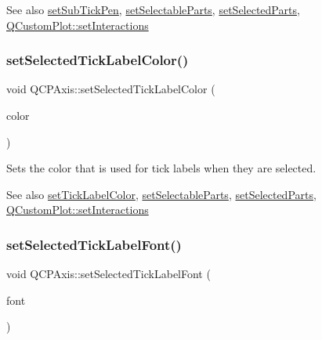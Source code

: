 \begin{DoxySeeAlso}{See also}
\mbox{\hyperlink{class_q_c_p_axis_aede4028ae7516bd51a60618a8233f9cf}{set\+Sub\+Tick\+Pen}}, \mbox{\hyperlink{class_q_c_p_axis_a513f9b9e326c505d9bec54880031b085}{set\+Selectable\+Parts}}, \mbox{\hyperlink{class_q_c_p_axis_ab9d7a69277dcbed9119b3c1f25ca19c3}{set\+Selected\+Parts}}, \mbox{\hyperlink{class_q_custom_plot_a5ee1e2f6ae27419deca53e75907c27e5}{Q\+Custom\+Plot\+::set\+Interactions}} 
\end{DoxySeeAlso}
\mbox{\label{class_q_c_p_axis_a9bdbf5e63ab15187f3a1de9440129227}} 
\subsubsection{\texorpdfstring{set\+Selected\+Tick\+Label\+Color()}{setSelectedTickLabelColor()}}
{\footnotesize\ttfamily void Q\+C\+P\+Axis\+::set\+Selected\+Tick\+Label\+Color (\begin{DoxyParamCaption}\item[{const Q\+Color \&}]{color }\end{DoxyParamCaption})}

Sets the color that is used for tick labels when they are selected.

\begin{DoxySeeAlso}{See also}
\mbox{\hyperlink{class_q_c_p_axis_a395e445c3fe496b935bee7b911ecfd1c}{set\+Tick\+Label\+Color}}, \mbox{\hyperlink{class_q_c_p_axis_a513f9b9e326c505d9bec54880031b085}{set\+Selectable\+Parts}}, \mbox{\hyperlink{class_q_c_p_axis_ab9d7a69277dcbed9119b3c1f25ca19c3}{set\+Selected\+Parts}}, \mbox{\hyperlink{class_q_custom_plot_a5ee1e2f6ae27419deca53e75907c27e5}{Q\+Custom\+Plot\+::set\+Interactions}} 
\end{DoxySeeAlso}
\mbox{\label{class_q_c_p_axis_a845ccb560b7bc5281098a5be494145f6}} 
\subsubsection{\texorpdfstring{set\+Selected\+Tick\+Label\+Font()}{setSelectedTickLabelFont()}}
{\footnotesize\ttfamily void Q\+C\+P\+Axis\+::set\+Selected\+Tick\+Label\+Font (\begin{DoxyParamCaption}\item[{const Q\+Font \&}]{font }\end{DoxyParamCaption})}

